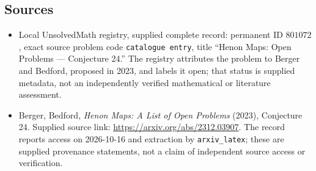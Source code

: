 \documentclass[11pt]{article}
\begin{document}
\subsection{Sources}
\begin{itemize}
\item Local UnsolvedMath registry, supplied complete record: permanent ID \(801072\), exact source problem code \texttt{catalogue entry}, title ``Henon Maps: Open Problems --- Conjecture 24.'' The registry attributes the problem to Berger and Bedford, proposed in 2023, and labels it open; that status is supplied metadata, not an independently verified mathematical or literature assessment.
\item Berger, Bedford, \emph{Henon Maps: A List of Open Problems} (2023), Conjecture 24. Supplied source link: \url{https://arxiv.org/abs/2312.03907}. The record reports access on 2026-10-16 and extraction by \texttt{arxiv\_latex}; these are supplied provenance statements, not a claim of independent source access or verification.
\end{itemize}
\end{document}
